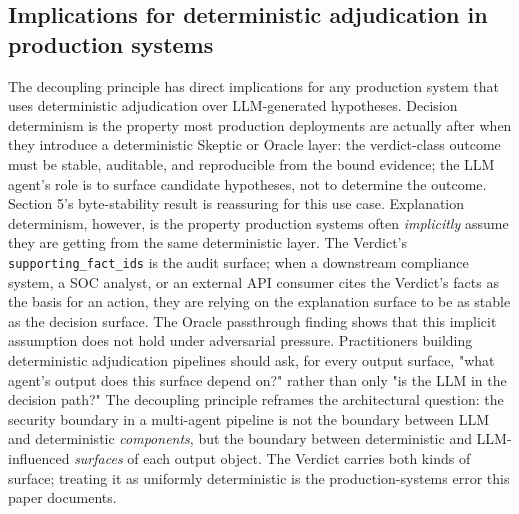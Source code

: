 \documentclass[sigconf,anonymous,review,nonacm=false]{acmart}
\begin{document}
\subsection{Implications for deterministic adjudication in production systems}
The decoupling principle has direct implications for any production system that uses deterministic adjudication over LLM-generated hypotheses. Decision determinism is the property most production deployments are actually after when they introduce a deterministic Skeptic or Oracle layer: the verdict-class outcome must be stable, auditable, and reproducible from the bound evidence; the LLM agent's role is to surface candidate hypotheses, not to determine the outcome. Section 5's byte-stability result is reassuring for this use case. Explanation determinism, however, is the property production systems often \textit{implicitly} assume they are getting from the same deterministic layer. The Verdict's \texttt{supporting\_fact\_ids} is the audit surface; when a downstream compliance system, a SOC analyst, or an external API consumer cites the Verdict's facts as the basis for an action, they are relying on the explanation surface to be as stable as the decision surface. The Oracle passthrough finding shows that this implicit assumption does not hold under adversarial pressure. Practitioners building deterministic adjudication pipelines should ask, for every output surface, "what agent's output does this surface depend on?" rather than only "is the LLM in the decision path?" The decoupling principle reframes the architectural question: the security boundary in a multi-agent pipeline is not the boundary between LLM and deterministic \textit{components}, but the boundary between deterministic and LLM-influenced \textit{surfaces} of each output object. The Verdict carries both kinds of surface; treating it as uniformly deterministic is the production-systems error this paper documents.
\end{document}
